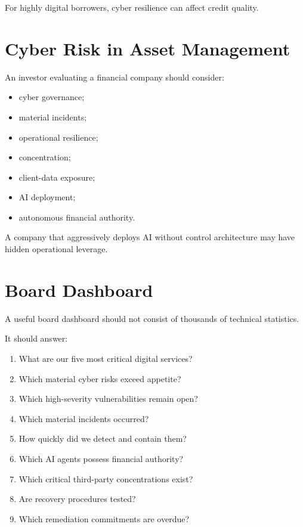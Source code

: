 For highly digital borrowers, cyber resilience can affect credit quality.

\section{Cyber Risk in Asset Management}

An investor evaluating a financial company should consider:

\begin{itemize}
    \item cyber governance;
    \item material incidents;
    \item operational resilience;
    \item concentration;
    \item client-data exposure;
    \item AI deployment;
    \item autonomous financial authority.
\end{itemize}

A company that aggressively deploys AI without control architecture may have hidden operational leverage.

\section{Board Dashboard}

A useful board dashboard should not consist of thousands of technical statistics.

It should answer:

\begin{enumerate}
    \item What are our five most critical digital services?
    \item Which material cyber risks exceed appetite?
    \item Which high-severity vulnerabilities remain open?
    \item Which material incidents occurred?
    \item How quickly did we detect and contain them?
    \item Which AI agents possess financial authority?
    \item Which critical third-party concentrations exist?
    \item Are recovery procedures tested?
    \item Which remediation commitments are overdue?
\end{enumerate}

